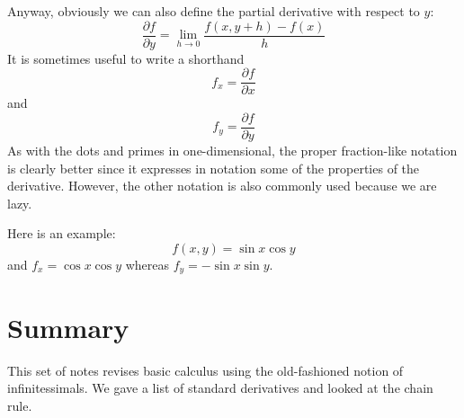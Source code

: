 \documentclass[12pt]{article}
\begin{document}
Anyway, obviously we can also define the partial derivative with respect to $y$:
\begin{equation}
  \frac{\partial f}{\partial y}=\lim_{h\rightarrow 0}\frac{f(x,y+h)-f(x)}{h}
\end{equation}
It is sometimes useful to write a shorthand
\begin{equation}
  f_x=\frac{\partial f}{\partial x}
\end{equation}
and
\begin{equation}
  f_y=\frac{\partial f}{\partial y}
\end{equation}
As with the dots and primes in one-dimensional, the proper
fraction-like notation is clearly better since it expresses in
notation some of the properties of the derivative. However, the other
notation is also commonly used because we are lazy.

Here is an example:
\begin{equation}
  f(x,y)=\sin{x}\cos{y}
\end{equation}
and $f_x=\cos{x}\cos{y}$ whereas $f_y=-\sin{x}\sin{y}$.





\section*{Summary}

This set of notes revises basic calculus using the old-fashioned
notion of infinitessimals. We gave a list of standard derivatives and
looked at the chain rule. 
\end{document}
